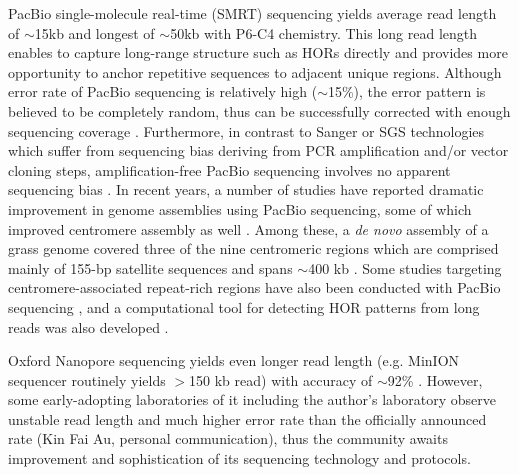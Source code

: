   PacBio single-molecule real-time (SMRT) sequencing yields average read length of $\sim$15kb and longest of $\sim$50kb with P6-C4 chemistry. This long read length enables to capture long-range structure such as HORs directly and provides more opportunity to anchor repetitive sequences to adjacent unique regions. Although error rate of PacBio sequencing is relatively high ($\sim$15\%), the error pattern is believed to be completely random, thus can be successfully corrected with enough sequencing coverage \cite{Myers2014}. Furthermore, in contrast to Sanger or SGS technologies which suffer from sequencing bias deriving from PCR amplification and/or vector cloning steps, amplification-free PacBio sequencing involves no apparent sequencing bias \cite{Ross2013}. In recent years, a number of studies have reported dramatic improvement in genome assemblies using PacBio sequencing, some of which improved centromere assembly as well \cite{VanBuren2015, Vij2016, Jiao2016}. Among these, a \textit{de novo} assembly of a grass genome covered three of the nine centromeric regions which are comprised mainly of 155-bp satellite sequences and spans $\sim$400 kb \cite{VanBuren2015}. Some studies targeting centromere-associated repeat-rich regions have also been conducted with PacBio sequencing \cite{Wolfgruber2016, Khost2016}, and a computational tool for detecting HOR patterns from long reads was also developed \cite{Sevim2016}.


  Oxford Nanopore sequencing yields even longer read length (e.g. MinION sequencer routinely yields $>$150 kb read) with accuracy of $\sim$92\% \cite{Jain2016}. However, some early-adopting laboratories of it including the author's laboratory observe unstable read length and much higher error rate than the officially announced rate (Kin Fai Au, personal communication), thus the community awaits improvement and sophistication of its sequencing technology and protocols.


